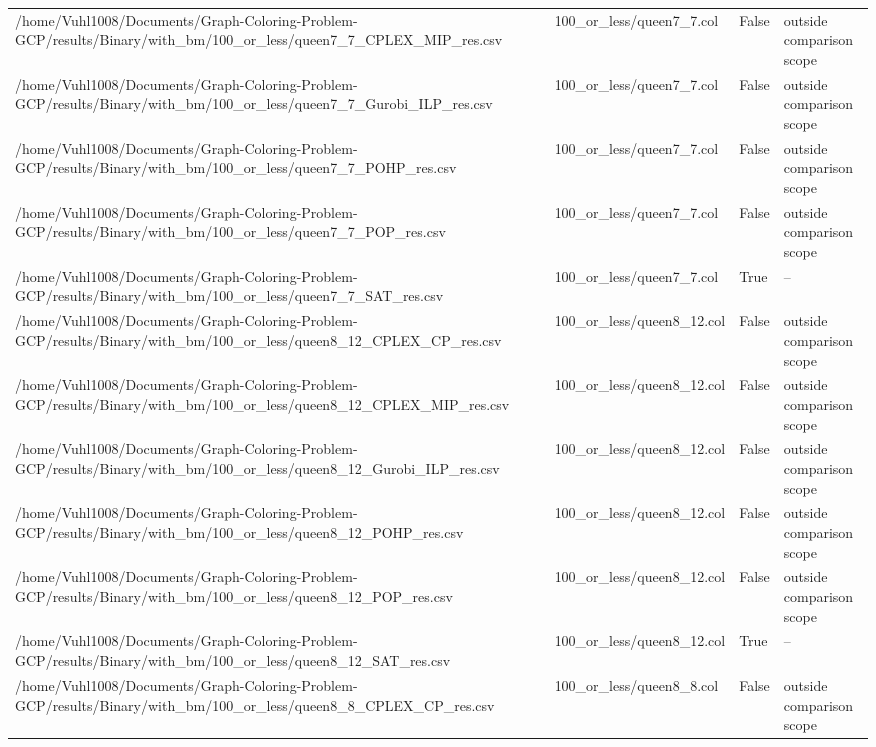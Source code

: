 \begin{table}[htbp]
\begin{tabular}{llll}
/home/Vuhl1008/Documents/Graph-Coloring-Problem-GCP/results/Binary/with\_bm/100\_or\_less/queen7\_7\_CPLEX\_MIP\_res.csv & 100\_or\_less/queen7\_7.col & False & outside comparison scope \\
/home/Vuhl1008/Documents/Graph-Coloring-Problem-GCP/results/Binary/with\_bm/100\_or\_less/queen7\_7\_Gurobi\_ILP\_res.csv & 100\_or\_less/queen7\_7.col & False & outside comparison scope \\
/home/Vuhl1008/Documents/Graph-Coloring-Problem-GCP/results/Binary/with\_bm/100\_or\_less/queen7\_7\_POHP\_res.csv & 100\_or\_less/queen7\_7.col & False & outside comparison scope \\
/home/Vuhl1008/Documents/Graph-Coloring-Problem-GCP/results/Binary/with\_bm/100\_or\_less/queen7\_7\_POP\_res.csv & 100\_or\_less/queen7\_7.col & False & outside comparison scope \\
/home/Vuhl1008/Documents/Graph-Coloring-Problem-GCP/results/Binary/with\_bm/100\_or\_less/queen7\_7\_SAT\_res.csv & 100\_or\_less/queen7\_7.col & True & -- \\
/home/Vuhl1008/Documents/Graph-Coloring-Problem-GCP/results/Binary/with\_bm/100\_or\_less/queen8\_12\_CPLEX\_CP\_res.csv & 100\_or\_less/queen8\_12.col & False & outside comparison scope \\
/home/Vuhl1008/Documents/Graph-Coloring-Problem-GCP/results/Binary/with\_bm/100\_or\_less/queen8\_12\_CPLEX\_MIP\_res.csv & 100\_or\_less/queen8\_12.col & False & outside comparison scope \\
/home/Vuhl1008/Documents/Graph-Coloring-Problem-GCP/results/Binary/with\_bm/100\_or\_less/queen8\_12\_Gurobi\_ILP\_res.csv & 100\_or\_less/queen8\_12.col & False & outside comparison scope \\
/home/Vuhl1008/Documents/Graph-Coloring-Problem-GCP/results/Binary/with\_bm/100\_or\_less/queen8\_12\_POHP\_res.csv & 100\_or\_less/queen8\_12.col & False & outside comparison scope \\
/home/Vuhl1008/Documents/Graph-Coloring-Problem-GCP/results/Binary/with\_bm/100\_or\_less/queen8\_12\_POP\_res.csv & 100\_or\_less/queen8\_12.col & False & outside comparison scope \\
/home/Vuhl1008/Documents/Graph-Coloring-Problem-GCP/results/Binary/with\_bm/100\_or\_less/queen8\_12\_SAT\_res.csv & 100\_or\_less/queen8\_12.col & True & -- \\
/home/Vuhl1008/Documents/Graph-Coloring-Problem-GCP/results/Binary/with\_bm/100\_or\_less/queen8\_8\_CPLEX\_CP\_res.csv & 100\_or\_less/queen8\_8.col & False & outside comparison scope \\

\end{tabular}
\end{table}
